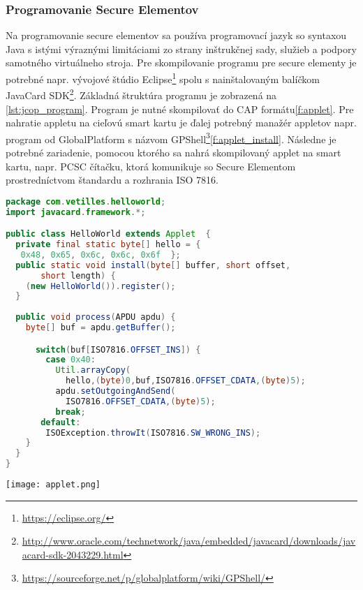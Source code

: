 \documentclass[12pt,a4paper,oneside,openright]{report}
\begin{document}
\subsubsection{Programovanie Secure Elementov}
Na programovanie secure elementov sa používa programovací jazyk so syntaxou Java s istými výraznými limitáciami zo strany inštrukčnej sady, služieb a podpory samotného virtuálneho stroja. Pre skompilovanie programu pre secure elementy je potrebné napr. vývojové štúdio Eclipse\footnote{\url{https://eclipse.org/}} spolu s nainštalovaným balíčkom JavaCard SDK\footnote{\url{http://www.oracle.com/technetwork/java/embedded/javacard/downloads/javacard-sdk-2043229.html}}.
Základná štruktúra programu je zobrazená na \ref{lst:jcop_program}. Program je nutné skompilovať do CAP formátu\ref{f:applet}.
Pre nahratie appletu na cieľovú smart kartu je ďalej potrebný manažér appletov napr. program od GlobalPlatform s názvom GPShell\footnote{\url{https://sourceforge.net/p/globalplatform/wiki/GPShell/}}\ref{f:applet_install}. Následne je potrebné zariadenie, pomocou ktorého sa nahrá skompilovaný applet na smart kartu, napr. PCSC čítačku, ktorá komunikuje so Secure Elementom prostredníctvom štandardu a rozhrania ISO 7816.
\begin{lstlisting}[caption={Hello World na platforme JCOP. \protect\cite{jchelloworld}}, label={lst:jcop_program}, language=java] 
package com.vetilles.helloworld;
import javacard.framework.*;

public class HelloWorld extends Applet  {
  private final static byte[] hello = {
   0x48, 0x65, 0x6c, 0x6c, 0x6f  };
  public static void install(byte[] buffer, short offset,
	   short length) {
    (new HelloWorld()).register();
  }
	
  public void process(APDU apdu) {
    byte[] buf = apdu.getBuffer(); 

      switch(buf[ISO7816.OFFSET_INS]) {
        case 0x40:
          Util.arrayCopy(
            hello,(byte)0,buf,ISO7816.OFFSET_CDATA,(byte)5);
          apdu.setOutgoingAndSend(
            ISO7816.OFFSET_CDATA,(byte)5);
          break;
       default:
        ISOException.throwIt(ISO7816.SW_WRONG_INS); 
    }
  }
}
\end{lstlisting}
\onehalfspacing

\begin{figure*}[h]
	\centering
	\texttt{[image: applet.png]}
	\caption{Kompilácia appletu do CAP formátu. \cite{javacardinstruction}}
	\label{f:applet}
\end{figure*}
\end{document}
